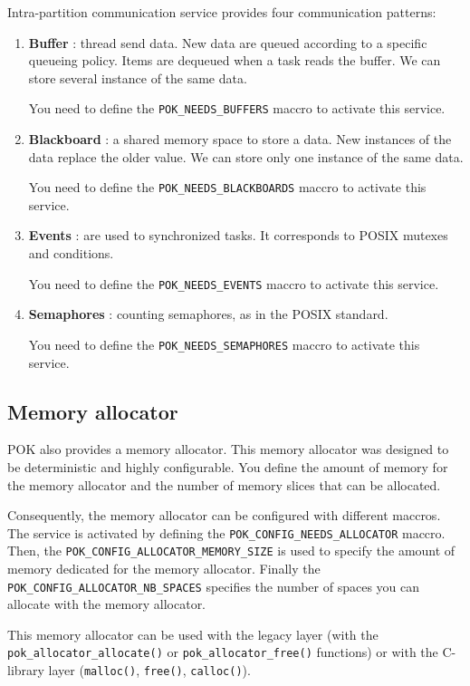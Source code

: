    Intra-partition communication service provides four communication patterns:
   \begin{enumerate}
      \item
         \textbf{Buffer} : thread send data. New data are queued according to a
         specific queueing policy. Items are dequeued when a task reads the
         buffer. We can store several instance of the same data.

         You need to define the \texttt{POK\_NEEDS\_BUFFERS} maccro to activate
         this service.
      \item
         \textbf{Blackboard} : a shared memory space to store a data. New
         instances of the data replace the older value. We can store only one
         instance of the same data.

         You need to define the \texttt{POK\_NEEDS\_BLACKBOARDS} maccro to activate
         this service.
      \item
         \textbf{Events} : are used to synchronized tasks. It corresponds to
         POSIX mutexes and conditions.

         You need to define the \texttt{POK\_NEEDS\_EVENTS} maccro to activate
         this service.
      \item
         \textbf{Semaphores} : counting semaphores, as in the POSIX standard.

         You need to define the \texttt{POK\_NEEDS\_SEMAPHORES} maccro to activate
         this service.
   \end{enumerate}

   \subsection{Memory allocator}
   POK also provides a memory allocator. This memory allocator was designed to
   be deterministic and highly configurable. You define the amount of memory for
   the memory allocator and the number of memory slices that can be allocated.

   Consequently, the memory allocator can be configured with different maccros.
   The service is activated by defining the
   \texttt{POK\_CONFIG\_NEEDS\_ALLOCATOR} maccro. Then, the
   \texttt{POK\_CONFIG\_ALLOCATOR\_MEMORY\_SIZE} is used to specify the amount
   of memory dedicated for the memory allocator. Finally the
   \texttt{POK\_CONFIG\_ALLOCATOR\_NB\_SPACES} specifies the number of spaces
   you can allocate with the memory allocator.

   This memory allocator can be used with the legacy layer (with the
   \texttt{pok\_allocator\_allocate()} or \texttt{pok\_allocator\_free()}
   functions) or with the C-library layer (\texttt{malloc()}, \texttt{free()},
   \texttt{calloc()}).


